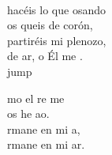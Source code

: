 \begin{cancion}[Amaos][Kairoi]
	\jump\\
	hacéis lo que osando\\
	os queis de corón,\\
	partiréis mi plenozo,\\
	de ar, o Él me . \\jump\\
	\begin{chorus}%
	mo el re me  \\
	 os he ao.\\
	rmane en mi a,\\
	rmane en mi ar.\\
	\end{chorus}%
	\jump\\
\end{cancion}%
